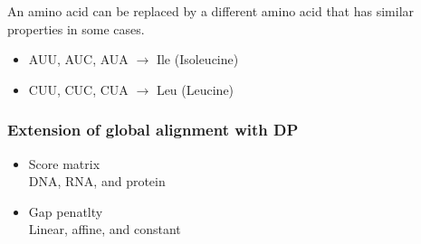 \noindent
An amino acid can be replaced by a different amino acid that has similar properties in some cases.
\begin{itemize}
\item AUU, AUC, AUA $\rightarrow$ Ile (Isoleucine)
\item CUU, CUC, CUA $\rightarrow$ Leu (Leucine)
\end{itemize}

%
%
\subsubsection*{Extension of global alignment with DP}

\begin{itemize}
\item Score matrix \\
DNA, RNA, and protein

\item Gap penatlty \\
Linear, affine, and constant
\end{itemize}



%
